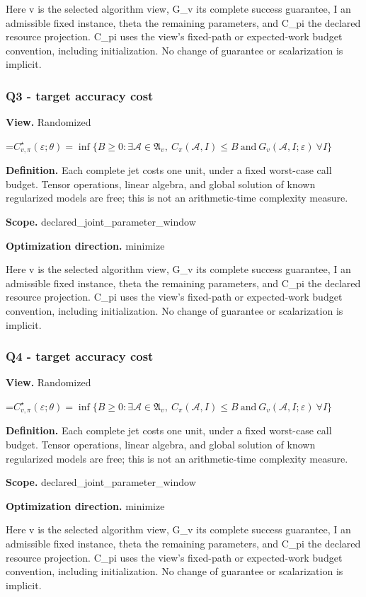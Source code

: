 \documentclass[10pt,a4paper]{article}
\newcommand{\AtlasMath}[1]{\par\begingroup\centering\setbox0=\hbox{$\displaystyle #1$}\ifdim\wd0>1.4\linewidth\typeout{ATLAS WIDE FORMULA: \the\wd0}\fi\ifdim\wd0>\linewidth\resizebox{\linewidth}{!}{\box0}\else\box0\fi\par\endgroup}
\begin{document}
Here v is the selected algorithm view, G\_v its complete success guarantee, I an admissible fixed instance, theta the remaining parameters, and C\_pi the declared resource projection. C\_pi uses the view's fixed-path or expected-work budget convention, including initialization. No change of guarantee or scalarization is implicit.

\subsubsection{Q3 - target accuracy cost}
\textbf{View.} Randomized

\AtlasMath{C^\star_{v,\pi}(\varepsilon;\theta)=\inf\{B\ge0:\exists\mathcal A\in\mathfrak A_v,\ C_\pi(\mathcal A,I)\le B\ \text{and}\ G_v(\mathcal A,I;\varepsilon)\ \forall I\}}
\textbf{Definition.} Each complete jet costs one unit, under a fixed worst-case call budget. Tensor operations, linear algebra, and global solution of known regularized models are free; this is not an arithmetic-time complexity measure.

\textbf{Scope.} declared\_joint\_parameter\_window

\textbf{Optimization direction.} minimize

Here v is the selected algorithm view, G\_v its complete success guarantee, I an admissible fixed instance, theta the remaining parameters, and C\_pi the declared resource projection. C\_pi uses the view's fixed-path or expected-work budget convention, including initialization. No change of guarantee or scalarization is implicit.

\subsubsection{Q4 - target accuracy cost}
\textbf{View.} Randomized

\AtlasMath{C^\star_{v,\pi}(\varepsilon;\theta)=\inf\{B\ge0:\exists\mathcal A\in\mathfrak A_v,\ C_\pi(\mathcal A,I)\le B\ \text{and}\ G_v(\mathcal A,I;\varepsilon)\ \forall I\}}
\textbf{Definition.} Each complete jet costs one unit, under a fixed worst-case call budget. Tensor operations, linear algebra, and global solution of known regularized models are free; this is not an arithmetic-time complexity measure.

\textbf{Scope.} declared\_joint\_parameter\_window

\textbf{Optimization direction.} minimize

Here v is the selected algorithm view, G\_v its complete success guarantee, I an admissible fixed instance, theta the remaining parameters, and C\_pi the declared resource projection. C\_pi uses the view's fixed-path or expected-work budget convention, including initialization. No change of guarantee or scalarization is implicit.
\end{document}

